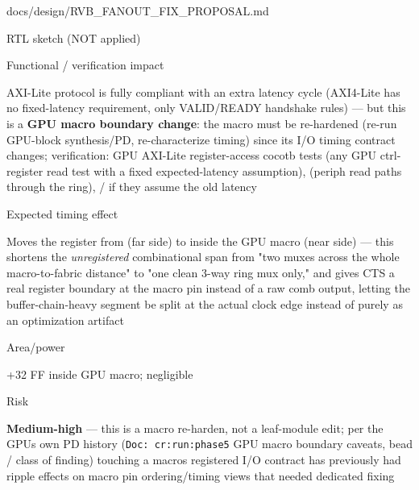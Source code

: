 \begin{relocated}{docs/design/RVB_FANOUT_FIX_PROPOSAL.md}
\begin{rowtable}
\begin{rowcell}{RTL sketch (NOT applied)}
\end{rowcell}

\begin{rowcell}{Functional / verification impact}

AXI-Lite protocol is fully compliant with an extra latency cycle
(AXI4-Lite has no fixed-latency requirement, only
VALID/\allowbreak{}READY handshake rules) --- but this is a \textbf{GPU
macro boundary change}: the macro must be re-hardened (re-run GPU-block
synthesis/\allowbreak{}PD, re-characterize timing) since its I/O timing
contract changes; verification: GPU AXI-Lite register-access cocotb
tests (any GPU ctrl-register read test with a fixed expected-latency
assumption),  (periph read paths through the ring),
/ if they
assume the old latency

\end{rowcell}

\begin{rowcell}{Expected timing effect}

Moves the register from  (far side) to inside the
GPU macro (near side) --- this shortens the \emph{unregistered}
combinational span from "two muxes across the whole macro-to-fabric
distance" to "one clean 3-way ring mux only," and gives CTS a real
register boundary at the macro pin instead of a raw comb output, letting
the buffer-chain-heavy segment be split at the actual clock edge instead
of purely as an optimization artifact

\end{rowcell}

\begin{rowcell}{Area/\allowbreak{}power}

+32 FF inside GPU macro; negligible

\end{rowcell}

\begin{rowcell}{Risk}

\textbf{Medium-high} --- this is a macro re-harden, not a leaf-module
edit; per the GPU\textquotesingle s own PD history
(\texttt{Doc:\allowbreak{}\ cr:\allowbreak{}run:\allowbreak{}phase5} GPU
macro boundary caveats, bead / class of finding)
touching a macro\textquotesingle s registered I/O contract has
previously had ripple effects on macro pin ordering/\allowbreak{}timing
views that needed dedicated fixing

\end{rowcell}


\end{rowtable}
\end{relocated}
